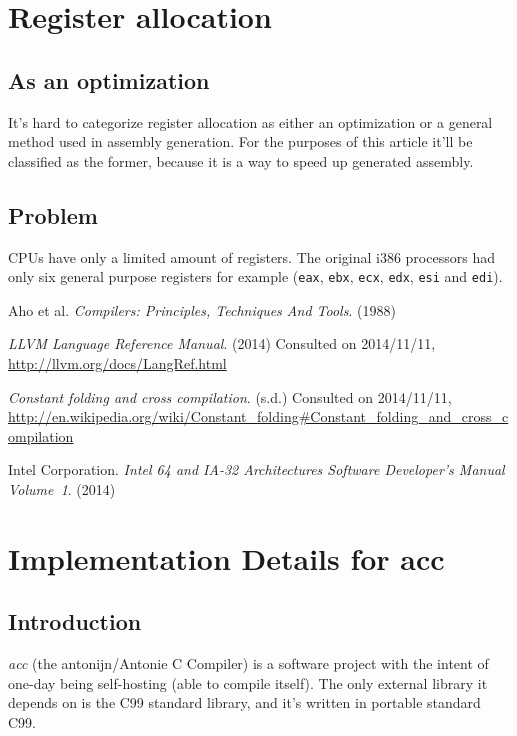 \documentclass[12pt, a4paper]{article}
\begin{document}
  \section{Register allocation}
  \label{sec:regalloc}
  \subsection{As an optimization}
It's hard to categorize register allocation as either an optimization or a
general method used in assembly generation. For the purposes of this article
it'll be classified as the former, because it is a way to speed up generated
assembly.

\subsection{Problem}
CPUs have only a limited amount of registers. The original i386 processors had
only six general purpose registers for example (\verb+eax+, \verb+ebx+, \verb+ecx+,
\verb+edx+, \verb+esi+ and \verb+edi+).\cite[section~3.4.1]{intel}

\begin{thebibliography}{9}
   Aho et al.
  \emph{Compilers: Principles, Techniques And Tools}.
  (1988)

  \emph{LLVM Language Reference Manual}. (2014) Consulted on 2014/11/11,
  \url{http://llvm.org/docs/LangRef.html}

  \emph{Constant folding and cross compilation}. (s.d.) Consulted on 2014/11/11,
  \url{http://en.wikipedia.org/wiki/Constant_folding#Constant_folding_and_cross_compilation}

  Intel Corporation.
  \emph{Intel\textregistered{} 64 and IA-32 Architectures Software Developer's
Manual Volume~1}.
  (2014)

\end{thebibliography}


\newpage
\appendix
\section{Implementation Details for acc}
\subsection{Introduction}
  \textit{acc} (the antonijn/Antonie C Compiler) is a software project with the intent of
one-day being self-hosting (able to compile itself). The only external library
it depends on is the C99 standard library, and it's written in portable standard C99.
\end{document}
